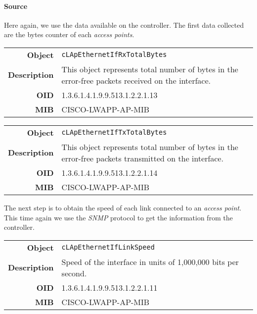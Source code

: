 \paragraph*{Source} Here again, we use the data available on the controller. The first data collected are the bytes counter of each \emph{access points}.

\begin{tabular}{|r l|}
\hline
\textbf{Object} & \texttt{cLApEthernetIfRxTotalBytes} \\
\textbf{Description} & \parbox{11cm}{This object represents total number of bytes in the error-free packets received on the interface.} \\
\textbf{OID} & 1.3.6.1.4.1.9.9.513.1.2.2.1.13 \\
\textbf{MIB} & CISCO-LWAPP-AP-MIB \\
\hline
\end{tabular}

\begin{tabular}{|r l|}
\hline
\textbf{Object} & \texttt{cLApEthernetIfTxTotalBytes} \\
\textbf{Description} & \parbox{11cm}{This object represents total number of bytes in the error-free packets transmitted on the interface.} \\
\textbf{OID} & 1.3.6.1.4.1.9.9.513.1.2.2.1.14 \\
\textbf{MIB} & CISCO-LWAPP-AP-MIB \\
\hline
\end{tabular}

The next step is to obtain the speed of each link connected to an \emph{access point}. This time again we use the \emph{SNMP} protocol to get the information from the controller.

\begin{tabular}{|r l|}
\hline
\textbf{Object} & \texttt{cLApEthernetIfLinkSpeed} \\
\textbf{Description} & \parbox{11cm}{Speed of the interface in units of 1,000,000 bits per second.} \\
\textbf{OID} & 1.3.6.1.4.1.9.9.513.1.2.2.1.11 \\
\textbf{MIB} & CISCO-LWAPP-AP-MIB \\
\hline
\end{tabular}


